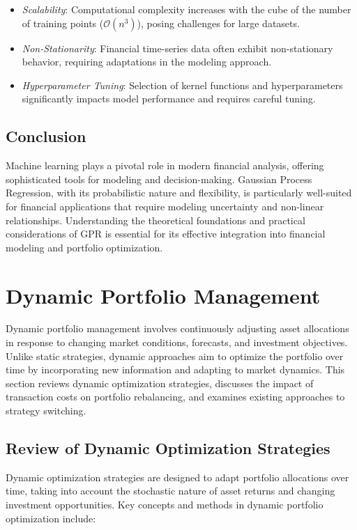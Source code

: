 \begin{itemize}
    \item \textit{Scalability}: Computational complexity increases with the cube of the number of training points ($\mathcal{O}(n^3)$), posing challenges for large datasets.
    \item \textit{Non-Stationarity}: Financial time-series data often exhibit non-stationary behavior, requiring adaptations in the modeling approach.
    \item \textit{Hyperparameter Tuning}: Selection of kernel functions and hyperparameters significantly impacts model performance and requires careful tuning.
\end{itemize}

\subsection{Conclusion}

Machine learning plays a pivotal role in modern financial analysis, offering sophisticated tools for modeling and decision-making. Gaussian Process Regression, with its probabilistic nature and flexibility, is particularly well-suited for financial applications that require modeling uncertainty and non-linear relationships. Understanding the theoretical foundations and practical considerations of GPR is essential for its effective integration into financial modeling and portfolio optimization.


\section{Dynamic Portfolio Management}

Dynamic portfolio management involves continuously adjusting asset allocations in response to changing market conditions, forecasts, and investment objectives. Unlike static strategies, dynamic approaches aim to optimize the portfolio over time by incorporating new information and adapting to market dynamics. This section reviews dynamic optimization strategies, discusses the impact of transaction costs on portfolio rebalancing, and examines existing approaches to strategy switching.

\subsection{Review of Dynamic Optimization Strategies}

Dynamic optimization strategies are designed to adapt portfolio allocations over time, taking into account the stochastic nature of asset returns and changing investment opportunities. Key concepts and methods in dynamic portfolio optimization include:

